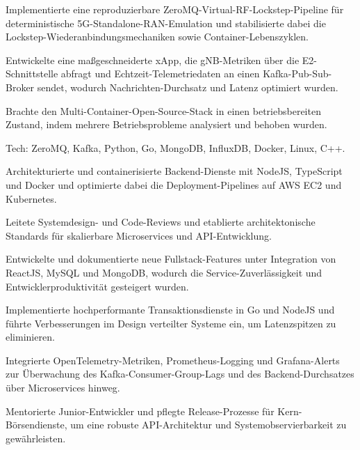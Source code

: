 \documentclass[10pt,a4paper]{resume}
\begin{document}
\bullets
  \item Implementierte eine reproduzierbare ZeroMQ-Virtual-RF-Lockstep-Pipeline für deterministische 5G-Standalone-RAN-Emulation und stabilisierte dabei die Lockstep-Wiederanbindungsmechaniken sowie Container-Lebenszyklen.
  \item Entwickelte eine maßgeschneiderte xApp, die gNB-Metriken über die E2-Schnittstelle abfragt und Echtzeit-Telemetriedaten an einen Kafka-Pub-Sub-Broker sendet, wodurch Nachrichten-Durchsatz und Latenz optimiert wurden.
  \item Brachte den Multi-Container-Open-Source-Stack in einen betriebsbereiten Zustand, indem mehrere Betriebsprobleme analysiert und behoben wurden.
  \item Tech: ZeroMQ, Kafka, Python, Go, MongoDB, InfluxDB, Docker, Linux, C++.
\bulletsend
\vspace{1.5pt}
\bullets
  \item Architekturierte und containerisierte Backend-Dienste mit NodeJS, TypeScript und Docker und optimierte dabei die Deployment-Pipelines auf AWS EC2 und Kubernetes.
  \item Leitete Systemdesign- und Code-Reviews und etablierte architektonische Standards für skalierbare Microservices und API-Entwicklung.
  \item Entwickelte und dokumentierte neue Fullstack-Features unter Integration von ReactJS, MySQL und MongoDB, wodurch die Service-Zuverlässigkeit und Entwicklerproduktivität gesteigert wurden.
\bulletsend
\vspace{1.5pt}
\bullets
  \item Implementierte hochperformante Transaktionsdienste in Go und NodeJS und führte Verbesserungen im Design verteilter Systeme ein, um Latenzspitzen zu eliminieren.
  \item Integrierte OpenTelemetry-Metriken, Prometheus-Logging und Grafana-Alerts zur Überwachung des Kafka-Consumer-Group-Lags und des Backend-Durchsatzes über Microservices hinweg.
  \item Mentorierte Junior-Entwickler und pflegte Release-Prozesse für Kern-Börsendienste, um eine robuste API-Architektur und Systemobservierbarkeit zu gewährleisten.
\bulletsend
\vspace{1.5pt}
\end{document}
